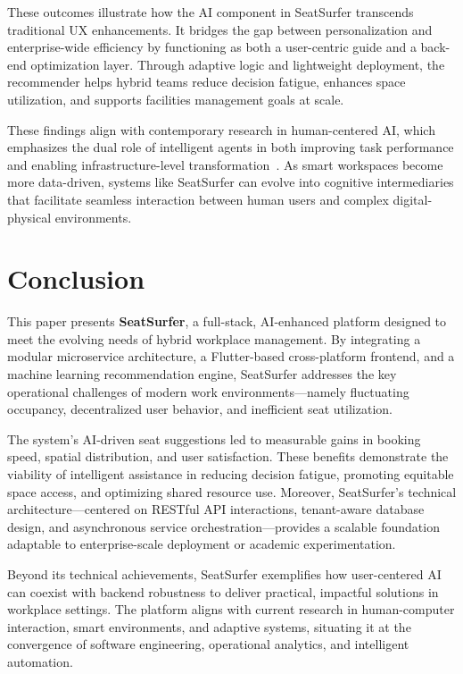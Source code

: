 \documentclass[onecolumn, 12pt]{IEEEtran}
\begin{document}
These outcomes illustrate how the AI component in SeatSurfer transcends traditional UX enhancements. It bridges the gap between personalization and enterprise-wide efficiency by functioning as both a user-centric guide and a back-end optimization layer. Through adaptive logic and lightweight deployment, the recommender helps hybrid teams reduce decision fatigue, enhances space utilization, and supports facilities management goals at scale.

These findings align with contemporary research in human-centered AI, which emphasizes the dual role of intelligent agents in both improving task performance and enabling infrastructure-level transformation~\cite{brown2022usertracking,zhang2022envaware}. As smart workspaces become more data-driven, systems like SeatSurfer can evolve into cognitive intermediaries that facilitate seamless interaction between human users and complex digital-physical environments.

\section{Conclusion}

This paper presents \textbf{SeatSurfer}, a full-stack, AI-enhanced platform designed to meet the evolving needs of hybrid workplace management. By integrating a modular microservice architecture, a Flutter-based cross-platform frontend, and a machine learning recommendation engine, SeatSurfer addresses the key operational challenges of modern work environments—namely fluctuating occupancy, decentralized user behavior, and inefficient seat utilization.

The system's AI-driven seat suggestions led to measurable gains in booking speed, spatial distribution, and user satisfaction. These benefits demonstrate the viability of intelligent assistance in reducing decision fatigue, promoting equitable space access, and optimizing shared resource use. Moreover, SeatSurfer's technical architecture—centered on RESTful API interactions, tenant-aware database design, and asynchronous service orchestration—provides a scalable foundation adaptable to enterprise-scale deployment or academic experimentation.

Beyond its technical achievements, SeatSurfer exemplifies how user-centered AI can coexist with backend robustness to deliver practical, impactful solutions in workplace settings. The platform aligns with current research in human-computer interaction, smart environments, and adaptive systems, situating it at the convergence of software engineering, operational analytics, and intelligent automation.
\end{document}
